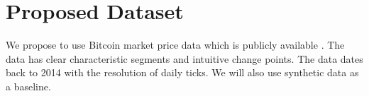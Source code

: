 \documentclass{article}
\begin{document}
\section{Proposed Dataset}
We propose to use Bitcoin market price data which is publicly available \cite{Bitcoin}. The data has clear characteristic segments and intuitive change points. The data dates back to 2014 with the resolution of daily ticks. We will also use synthetic data as a baseline.



\end{document}
